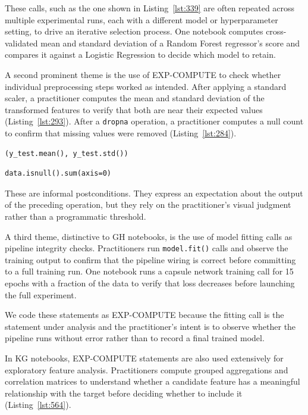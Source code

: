 These calls,
such as the one shown in Listing~\ref{lst:339}
are often repeated across multiple experimental runs,
each with a different model or hyperparameter setting,
to drive an iterative selection process.
One notebook computes cross-validated mean and standard deviation
of a Random Forest regressor's score
and compares it against a Logistic Regression
to decide which model to retain.

A second prominent theme is the use of EXP-COMPUTE
to check whether individual preprocessing steps worked as intended.
After applying a standard scaler,
a practitioner computes the mean and standard deviation of the transformed features
to verify that both are near their expected values (Listing~\ref{lst:293}).
After a \lstinline{dropna} operation,
a practitioner computes a null count to confirm that missing values were removed (Listing~\ref{lst:284}).

\begin{lstlisting}[caption={}, label={lst:293}]
(y_test.mean(), y_test.std())
\end{lstlisting}

\begin{lstlisting}[caption={}, label={lst:284}]
data.isnull().sum(axis=0)
\end{lstlisting}

These are informal postconditions.
They express an expectation about the output of the preceding operation,
but they rely on the practitioner's visual judgment
rather than a programmatic threshold.

A third theme,
distinctive to GH notebooks,
is the use of model fitting calls as pipeline integrity checks.
Practitioners run \lstinline{model.fit()} calls
and observe the training output
to confirm that the pipeline wiring is correct
before committing to a full training run.
One notebook runs a capsule network training call for 15 epochs
with a fraction of the data
to verify that loss decreases before launching the full experiment.

We code these statements as EXP-COMPUTE
because the fitting call is the statement under analysis
and the practitioner's intent is to observe whether the pipeline runs without error
rather than to record a final trained model.

In KG notebooks,
EXP-COMPUTE statements are also used extensively for exploratory feature analysis.
Practitioners compute grouped aggregations and correlation matrices
to understand whether a candidate feature
has a meaningful relationship with the target
before deciding whether to include it (Listing~\ref{lst:564}).

